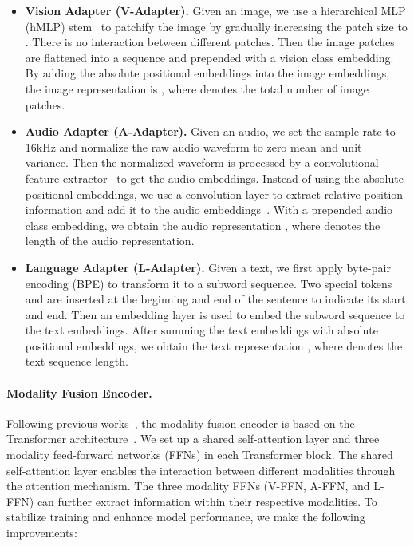 \documentclass{article}
\begin{document}
\begin{itemize}
    \item \textbf{Vision Adapter (V-Adapter).} Given an image, we use a hierarchical MLP (hMLP) stem~\cite{Touvron2022ThreeTE} to patchify the image by gradually increasing the patch size to . There is no interaction between different patches. Then the image patches are flattened into a sequence and prepended with a vision class embedding. By adding the absolute positional embeddings into the image embeddings, the image representation is , where  denotes the total number of image patches.
    \item \textbf{Audio Adapter (A-Adapter).} Given an audio, we set the sample rate to 16kHz and normalize the raw audio waveform to zero mean and unit variance. Then the normalized waveform is processed by a convolutional feature extractor~\cite{wav2vec2} to get the audio embeddings. Instead of using the absolute positional embeddings, we use a convolution layer to extract relative position information and add it to the audio embeddings~\cite{Mohamed2019TransformersWC}. With a prepended audio class embedding, we obtain the audio representation , where  denotes the length of the audio representation.
    \item \textbf{Language Adapter (L-Adapter).} Given a text, we first apply byte-pair encoding (BPE) \cite{bpe} to transform it to a subword sequence. Two special tokens  and  are inserted at the beginning and end of the sentence to indicate its start and end. Then an embedding layer is used to embed the subword sequence to the text embeddings. After summing the text embeddings with absolute positional embeddings, we obtain the text representation , where  denotes the text sequence length.
\end{itemize}

\paragraph{Modality Fusion Encoder.} 
Following previous works~\cite{simvlm,ofa,coca,beit3,ofasys}, the modality fusion encoder is based on the Transformer architecture~\cite{transformer}. 
We set up a shared self-attention layer and three modality feed-forward networks (FFNs) in each Transformer block.
The shared self-attention layer enables the interaction between different modalities through the attention mechanism.
The three modality FFNs (V-FFN, A-FFN, and L-FFN) can further extract information within their respective modalities.
To stabilize training and enhance model performance, we make the following improvements:
\end{document}
